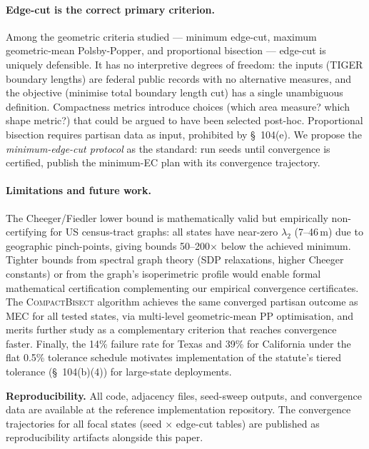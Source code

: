 \paragraph{Edge-cut is the correct primary criterion.}
Among the geometric criteria studied --- minimum edge-cut, maximum
geometric-mean Polsby-Popper, and proportional bisection --- edge-cut is
uniquely defensible. It has no interpretive degrees of freedom: the inputs
(TIGER boundary lengths) are federal public records with no alternative
measures, and the objective (minimise total boundary length cut) has a single
unambiguous definition. Compactness metrics introduce choices (which area
measure? which shape metric?) that could be argued to have been selected
post-hoc. Proportional bisection requires partisan data as input, prohibited
by \S~104(e). We propose the \emph{minimum-edge-cut protocol} as the
standard: run seeds until convergence is certified, publish the minimum-EC
plan with its convergence trajectory.

\paragraph{Limitations and future work.}
The Cheeger/Fiedler lower bound is mathematically valid but empirically
non-certifying for US census-tract graphs: all states have near-zero
$\lambda_2$ (7--46\,m) due to geographic pinch-points, giving bounds 50--200×
below the achieved minimum. Tighter bounds from spectral graph theory (SDP
relaxations, higher Cheeger constants) or from the graph's isoperimetric
profile would enable formal mathematical certification complementing our
empirical convergence certificates. The \textsc{CompactBisect} algorithm
achieves the same converged partisan outcome as MEC for all tested states, via
multi-level geometric-mean PP optimisation, and merits further study as a
complementary criterion that reaches convergence faster. Finally, the 14\%
failure rate for Texas and 39\% for California under the flat 0.5\% tolerance
schedule motivates implementation of the statute's tiered tolerance
(\S~104(b)(4)) for large-state deployments.

\vspace{1em}
\noindent\textbf{Reproducibility.} All code, adjacency files, seed-sweep
outputs, and convergence data are available at the reference implementation
repository. The convergence trajectories for all focal states (seed $\times$
edge-cut tables) are published as reproducibility artifacts alongside this
paper.
